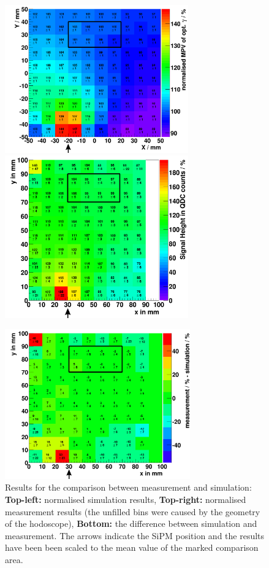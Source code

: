 \begin{figure}[h]
\centering
\includegraphics[width=7.9cm]{Figures/dietzlaursonn/comparison_sim_B_opticalCoupling_1_43_1cm.png}
\includegraphics[width=7.9cm]{Figures/dietzlaursonn/comparison_meas_B_1cm.png}

\vspace{0.5cm}
\includegraphics[width=8cm]{Figures/dietzlaursonn/comparison_diff_B_opticalCoupling_1_43_1cm.png}
\caption{Results for the comparison between measurement and simulation: \textbf{Top-left:} normalised simulation results, \textbf{Top-right:} normalised measurement results (the unfilled bins were caused by the geometry of the hodoscope), \textbf{Bottom:} the difference between simulation and measurement. The arrows indicate the SiPM position and the results have been been scaled to the mean value of the marked comparison area.}
\label{fig:comparison}
\end{figure}



